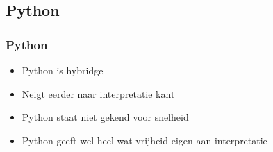 \subsection{Python}

\frame{\tableofcontents[currentsubsection]}

\begin{frame}
  \frametitle{Python}
  \begin{itemize}
    \item Python is hybridge
    \item Neigt eerder naar interpretatie kant
    \item Python staat niet gekend voor snelheid
    \item Python geeft wel heel wat vrijheid eigen aan interpretatie
  \end{itemize}
\end{frame}


